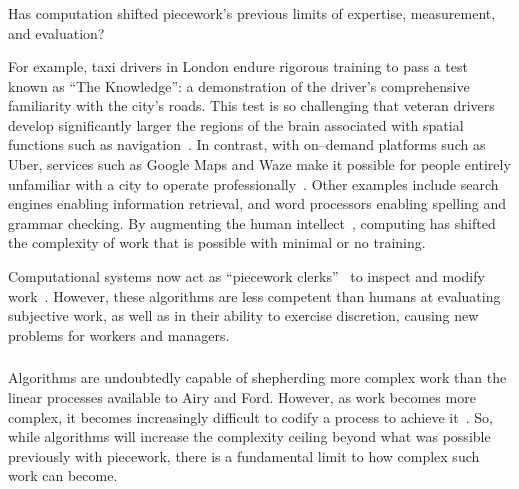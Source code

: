 \documentclass[trackingWork]{subfiles}
\begin{document}
\subsubsection{\whatchanged}
\begin{comment}
  mangeerial overhead limits, so what's different
  more people can now do complex work without training (more complex)
  parts of management can be automated (more firms)
  cheaper to create the infrastructure (more complex)
\end{comment}

Has computation shifted piecework's previous limits of
expertise, measurement, and evaluation?

For example, taxi drivers in London endure rigorous training to pass a test known as ``The Knowledge'': a demonstration of the driver's comprehensive familiarity with the city's roads.
This test is so challenging that veteran drivers develop significantly larger
the regions of the brain associated with spatial functions such as navigation~\cite{Maguire11042000,Maguire2894,Skok:1999:KML:299513.299625,skok2000managing,Woollett1407,woollett2011acquiring}.
In contrast, with on--demand platforms such as Uber, services such as Google Maps and Waze make it possible for
people entirely unfamiliar with a city
to operate professionally~\cite{silva2013traffic,hind2014outsmarting}.
Other examples include search engines enabling information retrieval, and
word processors enabling spelling and grammar checking.
By augmenting the human intellect~\cite{engelbart2001augmenting},
computing has shifted the complexity of work that is possible with minimal or no training.

Computational systems now act as ``piecework clerks''~\cite{10.2307/23702539} to
inspect and modify work~\cite{turkopticon,takingAHITMcInnis}.
However, these algorithms are less competent than humans at evaluating subjective work, as well as
in their ability to exercise discretion, causing new problems for workers and managers.

\subsubsection{\implication}
Algorithms are undoubtedly capable of shepherding more complex work than the linear processes available to Airy and Ford.
However, as work becomes more complex,
it becomes increasingly difficult to codify a process to achieve it~\cite{Faraj2006a,edmondson2012teaming}.
So, while algorithms will increase the complexity ceiling beyond what was possible previously with piecework, there is a fundamental limit to how complex such work can become.
\end{document}
